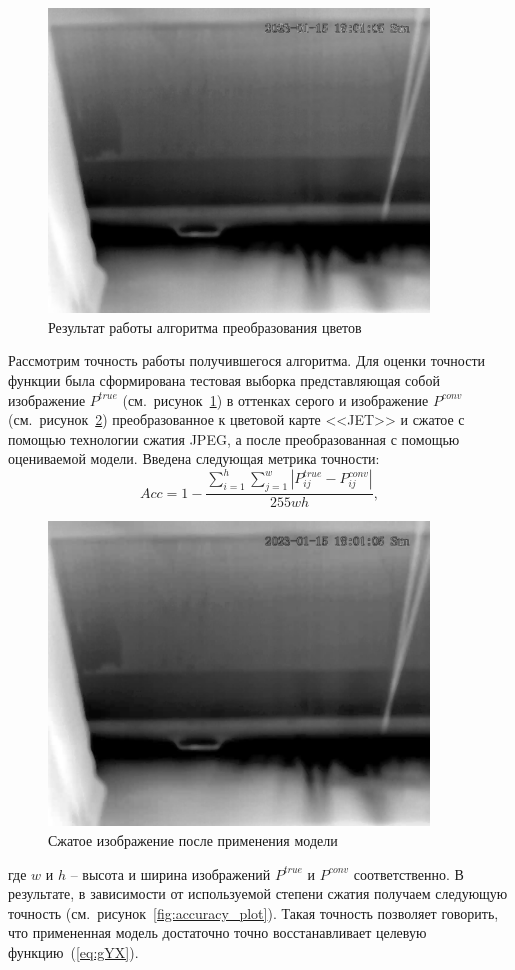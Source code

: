 \documentclass[14pt, a4paper]{extreport}
\begin{document}
	\begin{figure}[h!]
		\centering
		\includegraphics[width = 0.9\textwidth, height = 0.475\textwidth]{image/chapter_2/gray_tep_example}
		\vspace*{-0.2cm}	
		\caption{Результат работы алгоритма преобразования цветов}
		\label{fig:grey1}
		\vspace*{0.4cm}
	\end{figure}
	Рассмотрим точность работы получившегося алгоритма. Для оценки точности функции была сформирована тестовая выборка представляющая собой изображение $P^{true}$ (см.~рисунок~\ref{fig:grey1}) в оттенках серого и изображение $P^{conv}$ (см.~рисунок~\ref{fig:grey2}) преобразованное к цветовой карте <<JET>> и сжатое с помощью технологии сжатия JPEG, а после преобразованная с помощью оцениваемой модели. Введена следующая метрика точности:
	\begin{equation}
		Acc = 1 - \frac{\sum\limits_{i=1}^h \sum\limits_{j=1}^w |P^{true}_{ij} - P^{conv}_{ij}|}{255wh},
		\label{eq:flanaccuracy}
	\end{equation}
	\begin{figure}[h!]
		\centering
		\includegraphics[width = 0.9\textwidth, height = 0.475\textwidth]{image/chapter_2/grey2}
		\vspace*{-0.2cm}
		\caption{Сжатое изображение после применения модели}
		\label{fig:grey2}
	\end{figure}
	где $w$ и $h$ -- высота и ширина изображений $P^{true}$ и $P^{conv}$ соответственно. В результате, в зависимости от используемой степени сжатия получаем следующую точность (см.~рисунок~\ref{fig:accuracy_plot}). Такая точность позволяет говорить, что примененная модель достаточно точно восстанавливает целевую функцию~(\ref{eq:gYX}).
	
\end{document}
